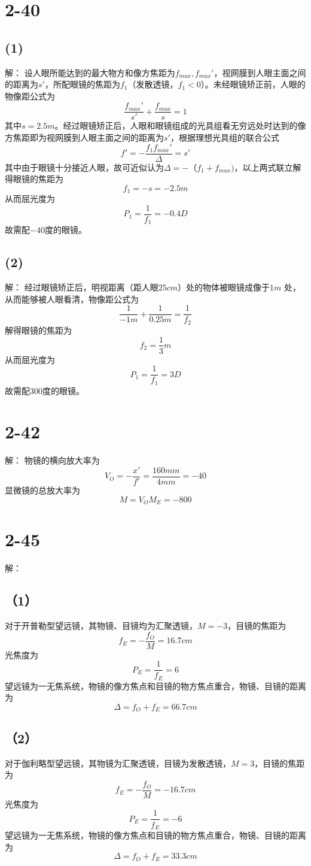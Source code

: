 \documentclass[10pt,a4paper]{article}
\theoremstyle{remark}
\begin{document}
\section*{2-40}
\subsection*{(1)}解：
设人眼所能达到的最大物方和像方焦距为$f_{max},f_{max}'$，视网膜到人眼主面之间的距离为$s'$，所配眼镜的焦距为$f_1$（发散透镜，$f_1 < 0$）。未经眼镜矫正前，人眼的物像距公式为
\[
\frac{f_{max}'}{s'} + \frac{f_{max}}{s} = 1
\]
其中$s = 2.5m$。经过眼镜矫正后，人眼和眼镜组成的光具组看无穷远处时达到的像方焦距即为视网膜到人眼主面之间的距离为$s'$，根据理想光具组的联合公式
\[
f' = -\frac{f_1f_{max}'}{\Delta} = s'
\]
其中由于眼镜十分接近人眼，故可近似认为$\Delta = -（f_1 + f_{max})$，以上两式联立解得眼镜的焦距为
\[
f_1 = -s = -2.5m
\]
从而屈光度为
\[
P_1 = \frac{1}{f_1} = -0.4D
\]
故需配$-40$度的眼镜。
\subsection*{(2)}解：
经过眼镜矫正后，明视距离（距人眼$25cm$）处的物体被眼镜成像于$1m$ 处，从而能够被人眼看清，物像距公式为
\[
\frac{1}{-1m} + \frac{1}{0.25m} = \frac{1}{f_2}
\]
解得眼镜的焦距为
\[
f_2 = \frac{1}{3}m
\]
从而屈光度为
\[
P_1 = \frac{1}{f_1} = 3D
\]
故需配$300$度的眼镜。
\section*{2-42}解：
物镜的横向放大率为
\[
V_O = -\frac{x'}{f'} = \frac{160mm}{4mm} = -40
\]
显微镜的总放大率为
\[
M = V_OM_E = -800
\]
\section*{2-45}解：
\subsection*{（1）}对于开普勒型望远镜，其物镜、目镜均为汇聚透镜，$M = -3$，目镜的焦距为
\[
f_E = -\frac{f_O}{M} = 16.7cm
\]
光焦度为
\[
P_E = \frac{1}{f_E} = 6
\]
望远镜为一无焦系统，物镜的像方焦点和目镜的物方焦点重合，物镜、目镜的距离为
\[
\Delta = f_O + f_E = 66.7cm
\]
\subsection*{（2）}对于伽利略型望远镜，其物镜为汇聚透镜，目镜为发散透镜，$M = 3$，目镜的焦距为
\[
f_E = -\frac{f_O}{M} = -16.7cm
\]
光焦度为
\[
P_E = \frac{1}{f_E} = -6
\]
望远镜为一无焦系统，物镜的像方焦点和目镜的物方焦点重合，物镜、目镜的距离为
\[
\Delta = f_O + f_E = 33.3cm
\]
\end{document}
